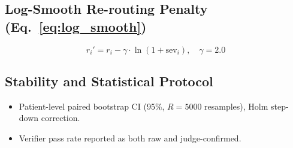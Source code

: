 \documentclass[11pt,a4paper]{article}
\begin{document}
\subsection{Log-Smooth Re-routing Penalty (Eq.~\ref{eq:log_smooth})}
\begin{equation}
r_i' = r_i - \gamma \cdot \ln(1 + \mathrm{sev}_i), \quad \gamma = 2.0
\end{equation}

\subsection{Stability and Statistical Protocol}
\begin{itemize}[nosep]
    \item Patient-level paired bootstrap CI (95\%, $R{=}5000$ resamples), Holm step-down correction.
    \item Verifier pass rate reported as both raw and judge-confirmed.
\end{itemize}
\end{document}

